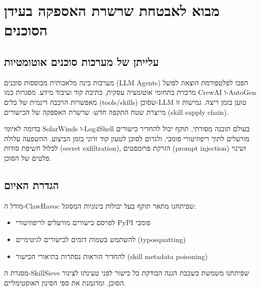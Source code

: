 
\chapter{מבוא לאבטחת שרשרת האספקה בעידן הסוכנים}

\section{עלייתן של מערכות סוכנים אוטומטיות}

מערכות בינה מלאכותית מבוססות סוכנים (\textenglish{LLM Agents}) הפכו לפלטפורמת הוצאה לפועל מרכזית בתחומי אוטומציה עסקית, כתיבת קוד ועיבוד מידע. מסגרות כמו \textenglish{CrewAI} \cite{hong2023metagpt} ו-\textenglish{AutoGen} \cite{wu2023autogen} מאפשרות הרכבה דינמית של כלים (\textenglish{tools/skills}) שסוכן-\textenglish{LLM} טוען בזמן ריצה. גמישות זו מייצרת שטח התקפה חדש: שרשרת האספקה של הכישורים (\textenglish{skill supply chain}).

בדומה לאיומי \textenglish{SolarWinds} ו-\textenglish{Log4Shell} בעולם תוכנה מסורתי, תוקף יכול להחדיר כישורים מורעלים לתוך ריפוזיטורי פומבי, ולגרום לסוכן לטעון קוד זדוני בזמן הביצוע. ההשפעה עלולה לכלול חשיפת סודות (\textenglish{secret exfiltration}), הזרקת פרומפטים (\textenglish{prompt injection}) \cite{perez2022ignore} ושינוי פלטים של הסוכן.

\section{הגדרת האיום}

מודל ה-\textenglish{ClawHavoc} שפיתחנו מתאר תוקף בעל יכולות בינוניות המסוגל:
\begin{itemize}
\item לפרסם כישורים מורעלים לריפוזיטורי \textenglish{PyPI} פומבי
\item להשתמש בשמות דומים לכישורים לגיטימיים (\textenglish{typosquatting})
\item להחדיר הוראות נסתרות בתיאורי הכישור (\textenglish{skill metadata poisoning})
\end{itemize}

מסגרת ה-\textenglish{SkillSieve} שפיתחנו \cite{nakash2024skillsieve} משמשת כשכבת הגנה הבודקת כל כישור לפני טעינתו לצינור הסוכן, ומדגמנת את ספי הסינון האופטימליים.

